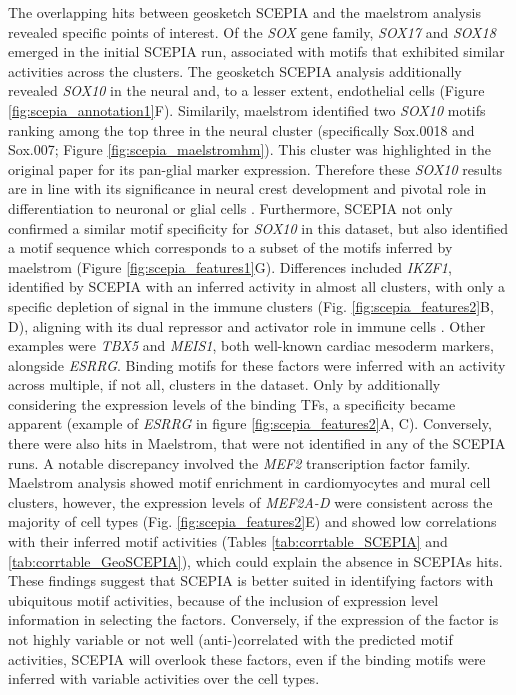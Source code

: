 The overlapping hits between geosketch SCEPIA and the maelstrom analysis revealed specific points of interest. Of the \textit{SOX} gene family, \textit{SOX17} and \textit{SOX18} emerged in the initial SCEPIA run, associated with motifs that exhibited similar activities across the clusters. The geosketch SCEPIA analysis additionally revealed \textit{SOX10} in the neural and, to a lesser extent, endothelial cells (Figure \ref{fig:scepia_annotation1}F). Similarily, maelstrom identified two \textit{SOX10} motifs ranking among the top three in the neural cluster (specifically Sox.0018 and Sox.007; Figure \ref{fig:scepia_maelstromhm}). This cluster was highlighted in the original paper for its pan-glial marker expression. Therefore these \textit{SOX10} results are in line with its significance in neural crest development and pivotal role in differentiation to neuronal or glial cells \cite{Lai2021}. Furthermore, SCEPIA not only confirmed a similar motif specificity for \textit{SOX10} in this dataset, but also identified a motif sequence which corresponds to a subset of the motifs inferred by maelstrom (Figure \ref{fig:scepia_features1}G). Differences included \textit{IKZF1}, identified by SCEPIA with an inferred activity in almost all clusters, with only a specific depletion of signal in the immune clusters (Fig. \ref{fig:scepia_features2}B, D), aligning with its dual repressor and activator role in immune cells \cite{Marke2018}. Other examples were \textit{TBX5} and \textit{MEIS1}, both well-known cardiac mesoderm markers, alongside \textit{ESRRG}. Binding motifs for these factors were inferred with an activity across multiple, if not all, clusters in the dataset. Only by additionally considering the expression levels of the binding TFs, a specificity became apparent (example of \textit{ESRRG} in figure \ref{fig:scepia_features2}A, C). Conversely, there were also hits in Maelstrom, that were not identified in any of the SCEPIA runs. A notable discrepancy involved the \textit{MEF2} transcription factor family. Maelstrom analysis showed motif enrichment in cardiomyocytes and mural cell clusters, however, the expression levels of \textit{MEF2A-D} were consistent across the majority of cell types (Fig. \ref{fig:scepia_features2}E) and showed low correlations with their inferred motif activities (Tables \ref{tab:corrtable_SCEPIA} and \ref{tab:corrtable_GeoSCEPIA}), which could explain the absence in SCEPIAs hits. These findings suggest that SCEPIA is better suited in identifying factors with ubiquitous motif activities, because of the inclusion of expression level information in selecting the factors. Conversely, if the expression of the factor is not highly variable or not well (anti-)correlated with the predicted motif activities, SCEPIA will overlook these factors, even if the binding motifs were inferred with variable activities over the cell types.

